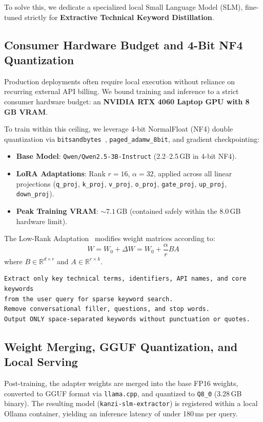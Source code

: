 \documentclass[sigconf,nonacm]{acmart}
\begin{document}
To solve this, we dedicate a specialized local Small Language Model (SLM), fine-tuned strictly for \textbf{Extractive Technical Keyword Distillation}.

\subsection{Consumer Hardware Budget and 4-Bit NF4 Quantization}
Production deployments often require local execution without reliance on recurring external API billing. We bound training and inference to a strict consumer hardware budget: an \textbf{NVIDIA RTX 4060 Laptop GPU with 8\,GB VRAM}.

To train within this ceiling, we leverage 4-bit NormalFloat (NF4) double quantization via \texttt{bitsandbytes}~\cite{qlora}, \texttt{paged\_adamw\_8bit}, and gradient checkpointing:
\begin{itemize}
    \item \textbf{Base Model}: \texttt{Qwen/Qwen2.5-3B-Instruct} (2.2--2.5\,GB in 4-bit NF4).
    \item \textbf{LoRA Adaptations}: Rank $r=16$, $\alpha=32$, applied across all linear projections (\texttt{q\_proj}, \texttt{k\_proj}, \texttt{v\_proj}, \texttt{o\_proj}, \texttt{gate\_proj}, \texttt{up\_proj}, \texttt{down\_proj}).
    \item \textbf{Peak Training VRAM}: $\sim 7.1$\,GB (contained safely within the 8.0\,GB hardware limit).
\end{itemize}

The Low-Rank Adaptation~\cite{lora} modifies weight matrices according to:
\begin{equation}
W = W_0 + \Delta W = W_0 + \frac{\alpha}{r} B A
\end{equation}
where $B \in \mathbb{R}^{d \times r}$ and $A \in \mathbb{R}^{r \times k}$.

\begin{lstlisting}[caption={SLM Keyword Distillation Prompt Template},label={lst:slm_prompt}]
Extract only key technical terms, identifiers, API names, and core keywords
from the user query for sparse keyword search.
Remove conversational filler, questions, and stop words.
Output ONLY space-separated keywords without punctuation or quotes.
\end{lstlisting}

\subsection{Weight Merging, GGUF Quantization, and Local Serving}
Post-training, the adapter weights are merged into the base FP16 weights, converted to GGUF format via \texttt{llama.cpp}, and quantized to \texttt{Q8\_0} (3.28\,GB binary). The resulting model (\texttt{kanzi-slm-extractor}) is registered within a local Ollama container, yielding an inference latency of under 180\,ms per query.
\end{document}
